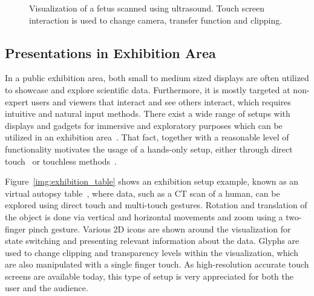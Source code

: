\documentclass[review,journal]{vgtc}         %
\begin{document}
%
%
%
%

\begin{figure}[htb]
	\centering
	\caption{Visualization of a fetus scanned using ultrasound. Touch screen interaction is used to change camera, transfer function and clipping.}
	\label{img:touch_workstation}
\end{figure}

\subsection{Presentations in Exhibition Area}
In a public exhibition area, both small to medium sized displays are often utilized to showcase and explore scientific data.
Furthermore, it is mostly targeted at non-expert users and viewers that interact and see others interact, which requires intuitive and natural input methods.
There exist a wide range of setups with displays and gadgets for immersive and exploratory purposes which can be utilized in an exhibition area~\cite{Laha:2013:VCB:2491367.2491368, conf/egve/KruszynskiL08}.
That fact, together with a reasonable level of functionality motivates the usage of a hands-only setup, either through direct touch~\cite{Klein:2012:DSD:2322389.2322403} or touchless methods~\cite{O'hara:2013:NTP:2442106.2442111}.

Figure~\ref{img:exhibition_table} shows an exhibition setup example, known as an virtual autopsy table~\cite{LRFPY11}, where data, such as a CT scan of a human, can be explored using direct touch and multi-touch gestures.
Rotation and translation of the object is done via vertical and horizontal movements and zoom using a two-finger pinch gesture.
Various 2D icons are shown around the visualization for state switching and presenting relevant information about the data.
Glyphs are used to change clipping and transparency levels within the visualization, which are also manipulated with a single finger touch.
As high-resolution accurate touch screens are available today, this type of setup is very appreciated for both the user and the audience.
\end{document}
